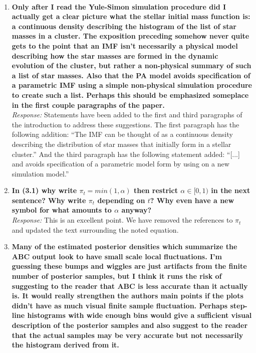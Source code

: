 \documentclass[11pt, oneside]{article}   	%
\begin{document}
\\

\begin{enumerate}
\item {\bf Only after I read the Yule-Simon simulation procedure did I actually get a clear picture what the stellar initial mass function is: a continuous density describing the histogram of the list of star masses in a cluster. The exposition preceding somehow never quite gets to the point that an IMF isn't necessarily a physical model describing how the star masses are formed in the dynamic evolution of the cluster, but rather a non-physical summary of such a list of star masses. Also that the PA model avoids specification of a parametric IMF using a simple non-physical simulation procedure to create such a list. Perhaps this should be emphasized someplace in the first couple paragraphs of the paper.
} \\
\noindent \emph{Response:} Statements have been added to the first and third paragraphs of the introduction to address these suggestions.  The first paragraph has the following addition:  ``The IMF can be thought of as a continuous density describing the distribution of star masses that initially form in a stellar cluster.'' And the third paragraph has the following statement added:  ``[...] and avoids specification of a parametric model form by using on a new simulation model.''
\bigskip

\item {\bf In (3.1) why write $\pi_t = min(1, \alpha)$  then restrict $\alpha \in [0, 1)$ in the next sentence? Why write $\pi_t$ depending on $t$? Why even have a new symbol for what amounts to $\alpha$ anyway?}\\
\noindent \emph{Response:} This is an excellent point.  We have removed the references to $\pi_t$ and updated the text surrounding the noted equation.
\bigskip

\item {\bf Many of the estimated posterior densities which summarize the ABC output look to have small scale local fluctuations. I'm guessing these bumps and wiggles are just artifacts from the finite number of posterior samples, but I think it runs the risk of suggesting to the reader that ABC is less accurate than it actually is. It would really strengthen the authors main points if the plots didn't have as much visual finite sample fluctuation. Perhaps step-line histograms with wide enough bins would give a sufficient visual description of the posterior samples and also suggest to the reader that the actual samples may be very accurate but not necessarily the histogram derived from it. \\

}
\end{enumerate}
\end{document}
